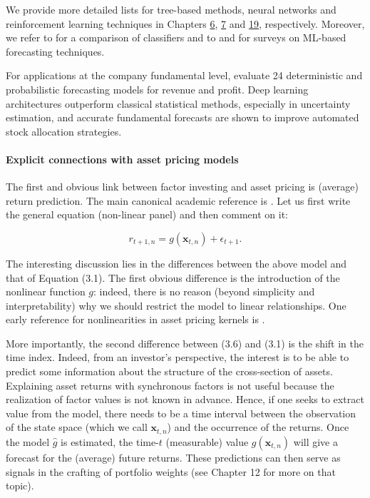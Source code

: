 We provide more detailed lists for tree-based methods, neural networks and reinforcement learning techniques in Chapters \href{/chap-07-trees}{6}, \href{/chap-08-neural-networks}{7} and \href{/chap-22-reinforcement-learning}{19}, respectively. Moreover, we refer to \cite{ballings2015evaluating} for a comparison of classifiers and to \cite{henrique2019literature} and \cite{bustos2020stock} for surveys on ML-based forecasting techniques.

For applications at the company fundamental level, \cite{divo2024forecasting} evaluate 24 deterministic and probabilistic forecasting models for revenue and profit. Deep learning architectures outperform classical statistical methods, especially in uncertainty estimation, and accurate fundamental forecasts are shown to improve automated stock allocation strategies.

\paragraph{Explicit connections with asset pricing models}

The first and obvious link between factor investing and asset pricing is (average) return prediction. The main canonical academic reference is \cite{gu2018empirical}. Let us first write the general equation (non-linear panel) and then comment on it:

\begin{equation}
\label{panel_Gu}
r_{t+1,n}=g(\textbf{x}_{t,n}) + \epsilon_{t+1}.
\end{equation}

The interesting discussion lies in the differences between the above model and that of Equation (3.1). The first obvious difference is the introduction of the nonlinear function $g$: indeed, there is no reason (beyond simplicity and interpretability) why we should restrict the model to linear relationships. One early reference for nonlinearities in asset pricing kernels is \cite{bansal1993no}.

More importantly, the second difference between (3.6) and (3.1) is the shift in the time index. Indeed, from an investor's perspective, the interest is to be able to predict some information about the structure of the cross-section of assets. Explaining asset returns with synchronous factors is not useful because the realization of factor values is not known in advance. Hence, if one seeks to extract value from the model, there needs to be a time interval between the observation of the state space (which we call $\textbf{x}_{t,n}$) and the occurrence of the returns. Once the model $\hat{g}$ is estimated, the time-$t$ (measurable) value $g(\textbf{x}_{t,n})$ will give a forecast for the (average) future returns. These predictions can then serve as signals in the crafting of portfolio weights (see Chapter 12 for more on that topic).

